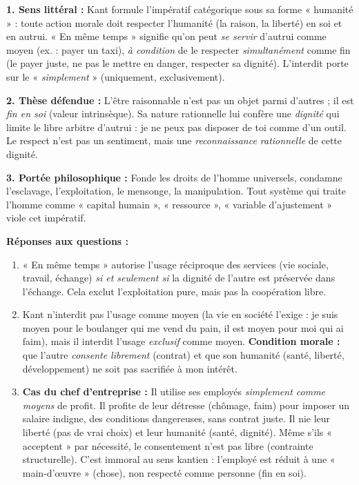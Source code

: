 \documentclass[11pt]{article}
\begin{document}
\begin{corrige}
\textbf{1. Sens littéral :} Kant formule l'impératif catégorique sous sa forme « humanité » : toute action morale doit respecter l'humanité (la raison, la liberté) en soi et en autrui. « En même temps » signifie qu'on peut \emph{se servir} d'autrui comme moyen (ex. : payer un taxi), \emph{à condition} de le respecter \emph{simultanément} comme fin (le payer juste, ne pas le mettre en danger, respecter sa dignité). L'interdit porte sur le « \emph{simplement} » (uniquement, exclusivement).
\par \textbf{2. Thèse défendue :} L'être raisonnable n'est pas un objet parmi d'autres ; il est \emph{fin en soi} (valeur intrinsèque). Sa nature rationnelle lui confère une \emph{dignité} qui limite le libre arbitre d'autrui : je ne peux pas disposer de toi comme d'un outil. Le respect n'est pas un sentiment, mais une \emph{reconnaissance rationnelle} de cette dignité.
\par \textbf{3. Portée philosophique :} Fonde les droits de l'homme universels, condamne l'esclavage, l'exploitation, le mensonge, la manipulation. Tout système qui traite l'homme comme « capital humain », « ressource », « variable d'ajustement » viole cet impératif.
\par \textbf{Réponses aux questions :}
\begin{enumerate}
\item « En même temps » autorise l'usage réciproque des services (vie sociale, travail, échange) \emph{si et seulement si} la dignité de l'autre est préservée dans l'échange. Cela exclut l'exploitation pure, mais pas la coopération libre.
\item Kant n'interdit pas l'usage comme moyen (la vie en société l'exige : je suis moyen pour le boulanger qui me vend du pain, il est moyen pour moi qui ai faim), mais il interdit l'usage \emph{exclusif} comme moyen. \textbf{Condition morale :} que l'autre \emph{consente librement} (contrat) et que son humanité (santé, liberté, développement) ne soit pas sacrifiée à mon intérêt.
\item \textbf{Cas du chef d'entreprise :} Il utilise ses employés \emph{simplement comme moyens} de profit. Il profite de leur détresse (chômage, faim) pour imposer un salaire indigne, des conditions dangereuses, sans contrat juste. Il nie leur liberté (pas de vrai choix) et leur humanité (santé, dignité). Même s'ils « acceptent » par nécessité, le consentement n'est pas libre (contrainte structurelle). C'est immoral au sens kantien : l'employé est réduit à une « main-d'œuvre » (chose), non respecté comme personne (fin en soi).
\end{enumerate}
\end{corrige}
\end{document}

